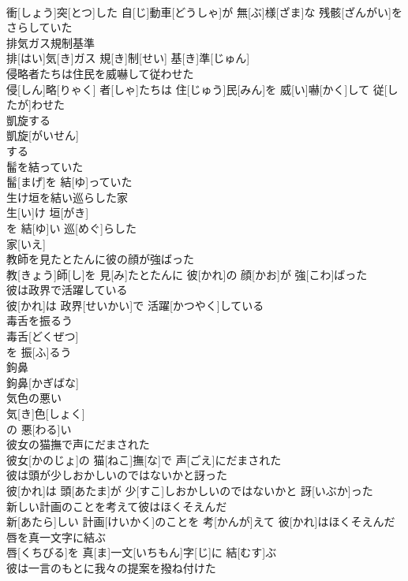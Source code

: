 \documentclass[8pt]{extreport}
\begin{document}
\begin{CJK}{UTF8}{min}
\\	衝[しょう]突[とつ]した 自[じ]動車[どうしゃ]が 無[ぶ]様[ざま]な 残骸[ざんがい]をさらしていた
\\	排気ガス規制基準	
\\	排[はい]気[き]ガス 規[き]制[せい] 基[き]準[じゅん]
\\	侵略者たちは住民を威嚇して従わせた	
\\	侵[しん]略[りゃく] 者[しゃ]たちは 住[じゅう]民[みん]を 威[い]嚇[かく]して 従[したが]わせた
\\	凱旋する	
\\	凱旋[がいせん]
\\	する 
\\	髷を結っていた	
\\	髷[まげ]を 結[ゆ]っていた
\\	生け垣を結い巡らした家	
\\	生[い]け 垣[がき]
\\	を 結[ゆ]い 巡[めぐ]らした 
\\	家[いえ]
\\	教師を見たとたんに彼の顔が強ばった	
\\	教[きょう]師[し]を 見[み]たとたんに 彼[かれ]の 顔[かお]が 強[こわ]ばった
\\	彼は政界で活躍している	
\\	彼[かれ]は 政界[せいかい]で 活躍[かつやく]している
\\	毒舌を振るう	
\\	毒舌[どくぜつ]
\\	を 振[ふ]るう 
\\	鉤鼻	
\\	鉤鼻[かぎばな]
\\	気色の悪い	
\\	気[き]色[しょく]
\\	の 悪[わる]い 
\\	彼女の猫撫で声にだまされた	
\\	彼女[かのじょ]の 猫[ねこ]撫[な]で 声[ごえ]にだまされた
\\	彼は頭が少しおかしいのではないかと訝った	
\\	彼[かれ]は 頭[あたま]が 少[すこ]しおかしいのではないかと 訝[いぶか]った
\\	新しい計画のことを考えて彼はほくそえんだ	
\\	新[あたら]しい 計画[けいかく]のことを 考[かんが]えて 彼[かれ]はほくそえんだ
\\	唇を真一文字に結ぶ	
\\	唇[くちびる]を 真[ま]一文[いちもん]字[じ]に 結[むす]ぶ
\\	彼は一言のもとに我々の提案を撥ね付けた	

\end{CJK}
\end{document}
